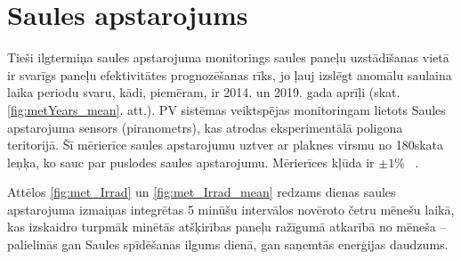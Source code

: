 \section{Saules apstarojums}


Tieši ilgtermiņa saules apstarojuma monitorings saules paneļu uzstādīšanas vietā ir svarīgs paneļu efektivitātes prognozēšanas rīks, jo ļauj izslēgt anomālu saulaina laika periodu svaru, kādi, piemēram, ir 2014. un 2019. gada aprīļi (skat. \ref{fig:metYears_mean}. att.). PV sistēmas veiktspējas monitoringam lietots Saules apstarojuma sensors (piranometrs), kas atrodas eksperimentālā poligona teritorijā. Šī mērierīce saules apstarojumu uztver ar plaknes virsmu no 180\textdegree skata leņķa, ko sauc par puslodes saules apstarojumu. Mērierīces kļūda ir  $\pm 1 \%$ ~\cite{pyranometer}.

Attēlos \ref{fig:met_Irrad} un \ref{fig:met_Irrad_mean} redzams dienas saules apstarojuma izmaiņas integrētas 5 minūšu intervālos novēroto četru mēnešu laikā, kas izskaidro turpmāk minētās atšķirības paneļu ražīgumā atkarībā no mēneša -- palielinās gan Saules spīdēšanas ilgums dienā, gan saņemtās enerģijas daudzums.

